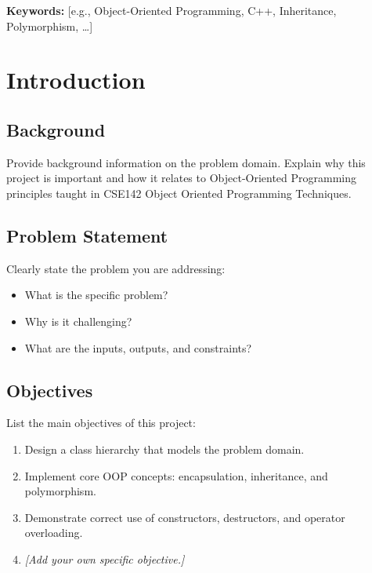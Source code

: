 \documentclass[11pt]{article}
\newcommand{\mycourse}{CSE142 Object Oriented Programming Techniques}
\begin{document}
\vspace{0.3cm}
\noindent\textbf{Keywords:} [e.g., Object-Oriented Programming, C++, Inheritance, Polymorphism, \ldots]

\newpage

\tableofcontents
\newpage

\section{Introduction}

\subsection{Background}
Provide background information on the problem domain. Explain why this project is important and how it relates to Object-Oriented Programming principles taught in \mycourse.

\subsection{Problem Statement}
Clearly state the problem you are addressing:
\begin{itemize}
    \item What is the specific problem?
    \item Why is it challenging?
    \item What are the inputs, outputs, and constraints?
\end{itemize}

\subsection{Objectives}
List the main objectives of this project:
\begin{enumerate}
    \item Design a class hierarchy that models the problem domain.
    \item Implement core OOP concepts: encapsulation, inheritance, and polymorphism.
    \item Demonstrate correct use of constructors, destructors, and operator overloading.
    \item[4.] \textit{[Add your own specific objective.]}
\end{enumerate}
\end{document}
